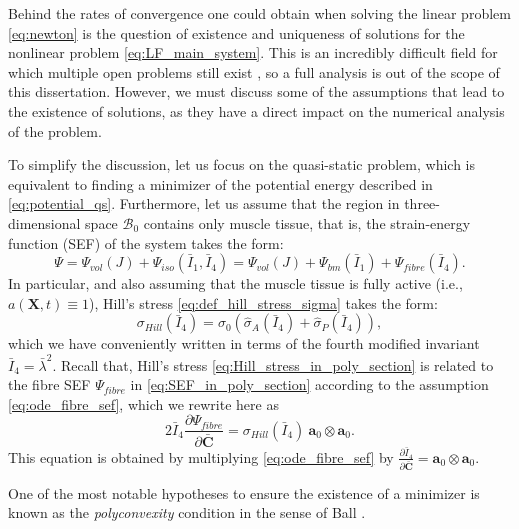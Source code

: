 \documentclass{sfuthesis}
\numberwithin{equation}{section}
\numberwithin{figure}{chapter}
\numberwithin{table}{chapter}
\theoremstyle{definition}
\def\*#1{{\mathbf{#1}}} %
\newcommand{\pder}[2]{\dfrac{\partial #1}{\partial #2}}
\newcommand{\B}{\mathcal{B}}
\newcommand{\I}{{\bar{I}}}
\begin{document}
Behind the rates of convergence one could obtain when solving the linear problem \eqref{eq:newton} is the question of existence and uniqueness of solutions for the nonlinear problem \eqref{eq:LF_main_system}. This is an incredibly difficult field for which multiple open problems still exist \cite{Ball2002,Ciarlet2021}, so a full analysis is out of the scope of this dissertation. However, we must discuss some of the assumptions that lead to the existence of solutions, as they have a direct impact on the numerical analysis of the problem. 

To simplify the discussion, let us focus on the quasi-static problem, which is equivalent to finding a minimizer of the potential energy described in \eqref{eq:potential_qs}. Furthermore, let us assume that the region in three-dimensional space $\B_0$ contains only muscle tissue, that is, the strain-energy function (SEF) of the system takes the form:
\begin{equation} \label{eq:SEF_in_poly_section}
    \Psi = \Psi_{vol}(J) + \Psi_{iso}(\I_1,\I_4) = \Psi_{vol}(J) + \Psi_{bm}(\I_1) + \Psi_{fibre}(\I_4).
\end{equation}
In particular, and also assuming that the muscle tissue is fully active (i.e., $a(\*X,t) \equiv 1$), Hill's stress \eqref{eq:def_hill_stress_sigma} takes the form:
\begin{equation} \label{eq:Hill_stress_in_poly_section}
    \sigma_{Hill}(\I_4) = \sigma_0 \left(\widehat{\sigma}_A(\I_4) + \widehat{\sigma}_P(\I_4) \right),
\end{equation}
which we have conveniently written in terms of the fourth modified invariant $\I_4 = \bar{\lambda}^2$. Recall that, Hill's stress \eqref{eq:Hill_stress_in_poly_section} is related to the fibre SEF $\Psi_{fibre}$ in \eqref{eq:SEF_in_poly_section} according to the assumption \eqref{eq:ode_fibre_sef}, which we rewrite here as
\begin{equation} \label{eq:dpsi_dC_poly}
    2\I_4 \pder{\Psi_{fibre}}{\bar{\*C}} = \sigma_{Hill}(\I_4) \ \*a_0 \otimes \*a_0.
\end{equation}
This equation is obtained by multiplying \eqref{eq:ode_fibre_sef} by $\frac{\partial\I_4}{\partial\bar{\*C}} = \*a_0 \otimes \*a_0$.

One of the most notable hypotheses to ensure the existence of a minimizer is known as the \textit{polyconvexity} condition in the sense of Ball \cite{Ball1976}. 
\end{document}
